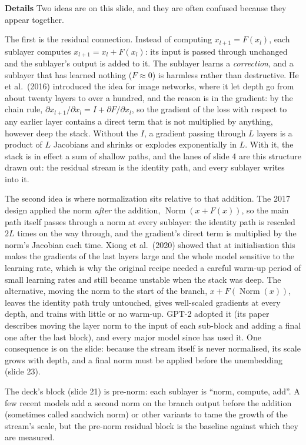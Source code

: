 \documentclass[11pt,letterpaper]{article}
\newcommand{\para}[1]{\medskip\noindent\textbf{#1}\quad}
\DeclareMathOperator{\Norm}{Norm}
\begin{document}
\para{Details} Two ideas are on this slide, and they are often confused because they appear together.

The first is the residual connection. Instead of computing $x_{l+1}=F(x_l)$, each sublayer computes $x_{l+1}=x_l+F(x_l)$: its input is passed through unchanged and the sublayer's output is added to it. The sublayer learns a \emph{correction}, and a sublayer that has learned nothing ($F\approx0$) is harmless rather than destructive. He et al.\ (2016) introduced the idea for image networks, where it let depth go from about twenty layers to over a hundred, and the reason is in the gradient: by the chain rule, $\partial x_{l+1}/\partial x_l=I+\partial F/\partial x_l$, so the gradient of the loss with respect to any earlier layer contains a direct term that is not multiplied by anything, however deep the stack. Without the $I$, a gradient passing through $L$ layers is a product of $L$ Jacobians and shrinks or explodes exponentially in $L$. With it, the stack is in effect a sum of shallow paths, and the lanes of slide 4 are this structure drawn out: the residual stream is the identity path, and every sublayer writes into it.

The second idea is where normalization sits relative to that addition. The 2017 design applied the norm \emph{after} the addition, $\Norm(x+F(x))$, so the main path itself passes through a norm at every sublayer: the identity path is rescaled $2L$ times on the way through, and the gradient's direct term is multiplied by the norm's Jacobian each time. Xiong et al.\ (2020) showed that at initialisation this makes the gradients of the last layers large and the whole model sensitive to the learning rate, which is why the original recipe needed a careful warm-up period of small learning rates and still became unstable when the stack was deep. The alternative, moving the norm to the start of the branch, $x+F(\Norm(x))$, leaves the identity path truly untouched, gives well-scaled gradients at every depth, and trains with little or no warm-up. GPT-2 adopted it (its paper describes moving the layer norm to the input of each sub-block and adding a final one after the last block), and every major model since has used it. One consequence is on the slide: because the stream itself is never normalised, its scale grows with depth, and a final norm must be applied before the unembedding (slide 23).

The deck's block (slide 21) is pre-norm: each sublayer is ``norm, compute, add''. A few recent models add a second norm on the branch output before the addition (sometimes called sandwich norm) or other variants to tame the growth of the stream's scale, but the pre-norm residual block is the baseline against which they are measured.
\end{document}
